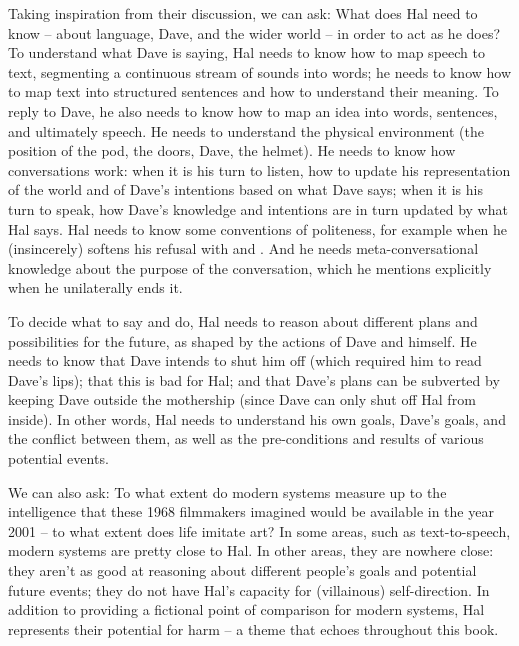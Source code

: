 Taking inspiration from their discussion, we can ask: What does Hal need to know -- about language, Dave, and the wider world -- in order to act as he does?  To understand what Dave is saying, Hal needs to know how to map speech to text, segmenting a continuous stream of sounds into words; he needs to know how to map text into structured sentences and how to understand their meaning.  To reply to Dave, he also needs to know how to map an idea into words, sentences, and ultimately speech.   He needs to understand the physical environment (the position of the pod, the doors, Dave, the helmet).  He needs to know how conversations work: when it is his turn to listen, how to update his representation of the world and of Dave's intentions based on what Dave says; when it is his turn to speak, how Dave's knowledge and intentions are in turn updated by what Hal says.    Hal  needs to know some conventions of politeness, for example when he (insincerely) softens his refusal with  and . And he needs meta-conversational knowledge about the purpose of the conversation, which he mentions explicitly when he unilaterally ends it.

To decide what to say and do, Hal needs to reason about different plans and possibilities for the future, as shaped by the actions of Dave and himself.  He needs to know that Dave intends to shut him off (which required him to read Dave's lips); that this is bad for Hal; and that Dave's plans can be subverted by keeping Dave outside the mothership (since Dave can only shut off Hal from inside).  In other words, Hal needs to understand his own goals, Dave's goals, and the conflict between them, as well as the pre-conditions and results of various potential events.


We can also ask: To what extent do modern systems measure up to the intelligence that these 1968 filmmakers imagined would be available in the year 2001 -- to what extent does life imitate art?  In some areas, such as text-to-speech, modern systems are pretty close to Hal.  In other areas, they are nowhere close: they aren't as good at reasoning about different people's goals and potential future events; they do not have Hal's capacity for (villainous) self-direction.  In addition to providing a fictional point of comparison for modern systems, 
Hal represents their potential for harm -- a theme that echoes throughout this book.



